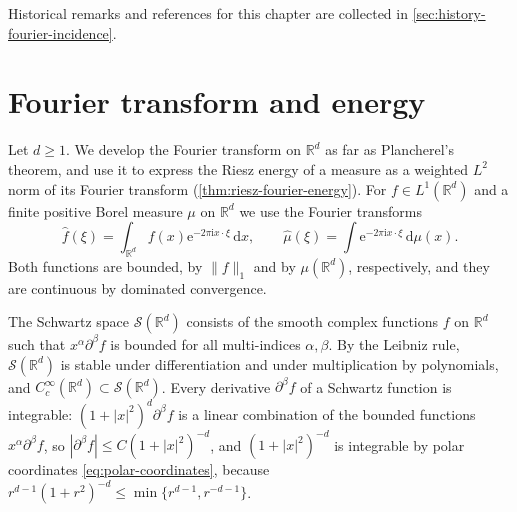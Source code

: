 Historical remarks and references for this chapter are collected in \cref{sec:history-fourier-incidence}.

\section{Fourier transform and energy}
\label{sec:fourier-energy}
Let $d\geq1$. We develop the Fourier transform on $\mathbb R^d$ as far as Plancherel's theorem, and use it to express the Riesz energy of a measure as a weighted $L^2$ norm of its Fourier transform (\cref{thm:riesz-fourier-energy}). For $f\in L^1(\mathbb R^d)$ and a finite positive Borel measure $\mu$ on $\mathbb R^d$ we use the Fourier transforms
\[
 \widehat f(\xi)=\int_{\mathbb R^d}f(x)\mathrm e^{-2\pi\mathrm i x\cdot\xi}\,\mathrm d x,
 \qquad \widehat\mu(\xi)=\int\mathrm e^{-2\pi\mathrm i x\cdot\xi}\,\mathrm d\mu(x).
\]
Both functions are bounded, by $\|f\|_1$ and by $\mu(\mathbb R^d)$, respectively, and they are continuous by dominated convergence.

The Schwartz space $\mathcal S(\mathbb R^d)$ consists of the smooth complex functions $f$ on $\mathbb R^d$ such that $x^\alpha\partial^\beta f$ is bounded for all multi-indices $\alpha,\beta$. By the Leibniz rule, $\mathcal S(\mathbb R^d)$ is stable under differentiation and under multiplication by polynomials, and $C_c^\infty(\mathbb R^d)\subset\mathcal S(\mathbb R^d)$. Every derivative $\partial^\beta f$ of a Schwartz function is integrable: $(1+|x|^2)^d\partial^\beta f$ is a linear combination of the bounded functions $x^\alpha\partial^\beta f$, so $|\partial^\beta f|\leq C(1+|x|^2)^{-d}$, and $(1+|x|^2)^{-d}$ is integrable by polar coordinates \eqref{eq:polar-coordinates}, because $r^{d-1}(1+r^2)^{-d}\leq\min\{r^{d-1},r^{-d-1}\}$.

